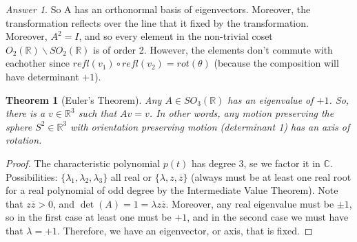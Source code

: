 \documentclass[12pt]{article}
\newtheorem{thm}{Theorem}[section]
\theoremstyle{definition}
\theoremstyle{remark}
\newtheorem*{ans}{Answer}
\numberwithin{equation}{section}
\newcommand\C{\mathbb C}    %
\newcommand\R{\mathbb R}    %
\begin{document}
\vspace{15pt}

\begin{ans}
        So A has an orthonormal basis of eigenvectors. Moreover, the transformation reflects over the line that it fixed by the transformation. Moreover, $A^2 = I$, and so every element in the non-trivial coset $O_2(\R)\backslash SO_2(\R)$ is of order 2. However, the elements don't commute with eachother since $refl(v_1)\circ refl(v_2) = rot(\theta)$ (because the composition will have determinant $+1$).
\end{ans}

\vspace{15pt}

\begin{thm}[Euler's Theorem]
        Any $A \in SO_3(\R)$ has an eigenvalue of $+1$. So, there is a $v \in \R^3$ such that $Av = v$. In other words, any motion preserving the sphere $S^2 \in \R^3$ with orientation preserving motion (determinant 1) has an axis of rotation.
\end{thm}
\begin{proof}
        The characteristic polynomial $p(t)$ has degree 3, se we factor it in $\C$. Possibilities: $\{\lambda_1,\lambda_2,\lambda_3\}$ all real or $\{\lambda, z, \overline{z}\}$ (always must be at least one real root for a real polynomial of odd degree by the Intermediate Value Theorem). Note that $z\overline{z} > 0$, and $\det(A) = 1 = \lambda z \overline{z}$. Moreover, any real eigenvalue must be $\pm 1$, so in the first case at least one must be $+1$, and in the second case we must have that $\lambda = +1$. Therefore, we have an eigenvector, or axis, that is fixed.
\end{proof}

\vspace{15pt}
\end{document}
